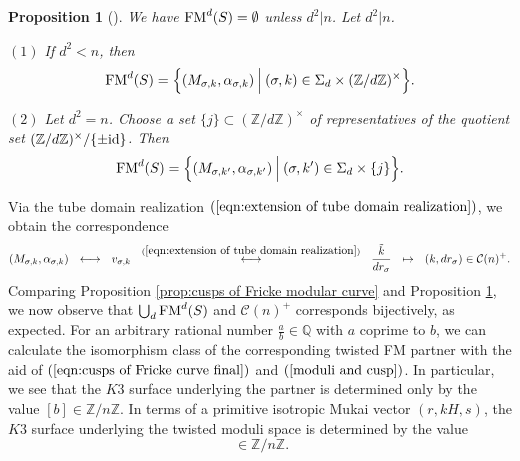 \documentclass{article}
\theoremstyle{plain}
\newtheorem{proposition}[theorem]{Proposition}%
\theoremstyle{definition}
\theoremstyle{remark}
\newcommand{\Z}{{\mathbb Z}}
\newcommand{\Q}{{\mathbb Q}}
\begin{document}
\begin{proposition}[\cite{Ma2}]\label{Ma}
We have ${\rm FM\/}^{d}(S) = \emptyset $ unless $d^{2}|n$. 
Let $d^{2}|n$. 

$(1)$ If $d^{2}<n$, then 
\begin{equation*}
{\rm FM\/}^{d}(S) = 
            \Bigl\{ \Bigl. 
                            (M_{\sigma , k}, \alpha _{\sigma , k}) \: 
                    \Bigr|  \: 
                          (\sigma , k) \in  \Sigma _{d} \times ({\Z}/d{\Z})^{\times}
            \Bigr\} . 
\end{equation*}

$(2)$ Let $d^{2}=n$. 
Choose a set $\{ j \} \subset ({\Z}/d{\Z})^{\times}$ 
of representatives of the quotient set 
$({\Z}/d{\Z})^{\times} / \{ \pm {\rm id \/} \} $. 
Then 
\begin{equation*}
{\rm FM\/}^{d}(S) = 
            \Bigl\{ \Bigl. 
                            (M_{\sigma , k'}, \alpha _{\sigma , k'}) 
                    \: \Bigr| \: 
                          (\sigma , k') \in  \Sigma _{d} \times \{ j \}
            \Bigr\} . 
\end{equation*}
\end{proposition}






Via the tube domain realization  
$(\ref{eqn:extension of tube domain realization})$, 
we obtain the correspondence  
\begin{equation}\label{moduli and cusp}
(M_{\sigma , k}, \alpha _{\sigma , k})  \: \: \: 
\longleftrightarrow     \: \: \:
v_{\sigma , k}  \: \: \: 
             \stackrel{(\ref{eqn:extension of tube domain realization})}{\longleftrightarrow}     \: \: \: 
                                                              \frac{\tilde{k}}{dr_{\sigma}}    \: \: \:     
            \mapsto     \: \: \: 
                                 (k, dr_{\sigma}) \in \mathcal{C}(n)^{+}. 
\end{equation}              
Comparing 
Proposition \ref{prop:cusps of Fricke modular curve}
and 
Proposition \ref{Ma}, 
we now observe that 
$\mathop{\bigcup}_{d} {\rm FM\/}^{d}(S)$  
and  
$\mathcal{C}(n)^{+}$
corresponds bijectively, 
as expected. 
For an arbitrary rational number $\frac{a}{b} \in {\Q}$ 
with $a$ coprime to $b$,  
we can calculate 
the isomorphism class of the corresponding twisted FM partner 
with the aid of 
$(\ref{eqn:cusps of Fricke curve final})$ and $(\ref{moduli and cusp})$. 
In particular, 
we see that the $K3$ surface underlying the partner  
is determined only by the value $[b] \in {\Z}/n{\Z}$.    
In terms of a primitive isotropic Mukai vector 
$(r, kH, s)$, 
the $K3$ surface underlying the twisted moduli space 
is determined by the value 
\begin{equation*}
[(r, k)^{-1} r] \: \in {\Z}/n{\Z}.
\end{equation*}
\end{document}
